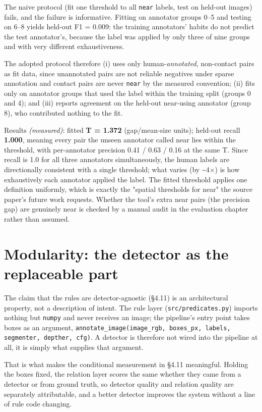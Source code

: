 The naive protocol (fit one threshold to all \texttt{near} labels, test on held-out images) fails, and the failure is informative. Fitting on annotator groups 0--5 and testing on 6--8 yields held-out F1 = 0.009: the training annotators' habits do not predict the test annotator's, because the label was applied by only three of nine groups and with very different exhaustiveness.

The adopted protocol therefore (i) uses only human-\textit{annotated}, non-contact pairs as fit data, since unannotated pairs are not reliable negatives under sparse annotation and contact pairs are never \texttt{near} by the measured convention; (ii) fits only on annotator groups that used the label within the training split (groups 0 and 4); and (iii) reports agreement on the held-out near-using annotator (group 8), who contributed nothing to the fit.

Results \textit{(measured)}: fitted \textbf{T = 1.372} (gap/mean-size units); held-out recall \textbf{1.000}, meaning every pair the unseen annotator called near lies within the threshold, with per-annotator precision 0.41 / 0.63 / 0.16 at the same T. Since recall is 1.0 for all three annotators simultaneously, the human labels are directionally consistent with a single threshold; what varies (by \textasciitilde{}4$\times$) is how exhaustively each annotator applied the label. The fitted threshold applies one definition uniformly, which is exactly the "spatial thresholds for near" the source paper's future work requests. Whether the tool's extra near pairs (the precision gap) are genuinely near is checked by a manual audit in the evaluation chapter rather than assumed.

\section{Modularity: the detector as the replaceable part}

The claim that the rules are detector-agnostic (\S4.11) is an architectural property, not a description of intent. The rule layer (\texttt{src/predicates.py}) imports nothing but \texttt{numpy} and never receives an image; the pipeline's entry point takes boxes as an argument, \texttt{annotate\_image(image\_rgb, boxes\_px, labels, segmenter, depther, cfg)}. A detector is therefore not wired into the pipeline at all, it is simply what supplies that argument.

That is what makes the conditional measurement in \S4.11 meaningful. Holding the boxes fixed, the relation layer scores the same whether they came from a detector or from ground truth, so detector quality and relation quality are separately attributable, and a better detector improves the system without a line of rule code changing.

